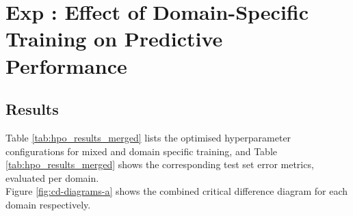 


        
            
\section[Exp. \Romannum{2}: Domain specific Training]{Exp : Effect of Domain-Specific Training on Predictive Performance} 

\subsection{Results}
Table \ref{tab:hpo_results_merged} lists the optimised hyperparameter configurations for mixed and domain specific training, and Table \ref{tab:hpo_results_merged} shows the corresponding test set error metrics, evaluated per domain. \\Figure \ref{fig:cd-diagrams-a} shows the combined critical difference diagram for each domain respectively. 

